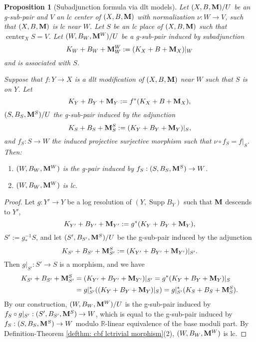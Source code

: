 \documentclass[11pt]{amsart}
\numberwithin{equation}{section}
\newcommand{\Mm}{{\bf{M}}}
\newcommand{\Rr}{\mathbb{R}}
\newcommand{\Center}{\operatorname{center}}
\newcommand{\Supp}{\operatorname{Supp}}
\newtheorem{prop}[thm]{Proposition}
\theoremstyle{definition}
\theoremstyle{definition}
\theoremstyle{definition}
\begin{document}
\begin{prop}[Subadjunction formula via dlt models]\label{prop: lc subadj is lc}
       Let $(X,B,\Mm)/U$ be an g-sub-pair and $V$ an lc center of $(X,B,\Mm)$ with normalization $\nu: W\rightarrow V$, such that $(X,B,\Mm)$ is lc near $W$. Let $S$ be an lc place of $(X,B,\Mm)$ such that $\Center_XS=V$. Let $(W,B_W,\Mm^W)/U$ be a g-sub-pair induced by subadjunction
    $$K_W+B_W+\Mm^W_W:=(K_X+B+\Mm_X)|_W$$
    and is associated with $S$.

    Suppose that $f: Y\rightarrow X$ is a dlt modification of $(X,B,\Mm)$ near $W$ such that $S$ is on $Y$. Let 
    $$K_Y+B_Y+\Mm_Y:=f^*(K_X+B+\Mm_X),$$
     $(S,B_{S},\Mm^S)/U$ the g-sub-pair induced by the adjunction
    $$K_{S}+B_{S}+\Mm^S_{S}:=(K_Y+B_Y+\Mm_Y)|_{S},$$
    and $f_{S}: S\rightarrow W$ the induced projective surjective morphism such that $\nu\circ f_S=f|_{S}$. Then:
    \begin{enumerate}
        \item $(W,B_W,\Mm^W)$ is the g-pair induced by $f_S: (S,B_S,\Mm^S)\rightarrow W$.
        \item $(W,B_W,\Mm^W)$ is lc.
    \end{enumerate}
\end{prop}
\begin{proof}
Let $g: Y'\rightarrow Y$ be a log resolution of $(Y,\Supp B_Y)$ such that $\Mm$ descends to $Y'$, 
    $$K_{Y'}+B_{Y'}+\Mm_{Y'}:=g^*(K_Y+B_Y+\Mm_Y),$$
    $S':=g^{-1}_*S$, and let $(S',B_{S'},\Mm^S)/U$ be the g-sub-pair induced by the adjunction
    $$K_{S'}+B_{S'}+\Mm^S_{S'}:=(K_{Y'}+B_{Y'}+\Mm_{Y'})|_{S'}.$$
    Then $g|_{S'}: S'\rightarrow S$ is a morphism, and we have
    \begin{align*}
       K_{S'}+B_{S'}+\Mm^S_{S'}&=(K_{Y'}+B_{Y'}+\Mm_{Y'})|_{S'}=g^*(K_Y+B_Y+\Mm_Y)|_{S}\\
       &=g|_{S'}^*((K_Y+B_Y+\Mm_Y)|_{S})=g|_{S'}^*(K_{S}+B_{S}+\Mm^S_{S}).
    \end{align*}
    By our construction, $(W,B_W,\Mm^W)/U$ is the g-sub-pair induced by $f_S\circ g|_{S'}: (S',B_{S'},\Mm^S)\rightarrow W$, which is equal to the g-sub-pair induced by $f_S: (S,B_{S},\Mm^S)\rightarrow W$ modulo $\Rr$-linear equivalence of the base moduli part. By Definition-Theorem \ref{defthm: cbf lctrivial morphism}(2), $(W,B_W,\Mm^W)$ is lc.
\end{proof}
\end{document}
